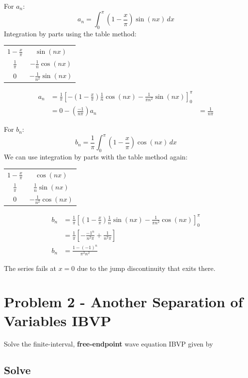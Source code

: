 \documentclass[11pt]{article}
\begin{document}
    For $a_n$:
    \[
        a_n = \int_0^{\pi} (1-\frac{x}{\pi}) \sin(nx) \,dx
    \]
    Integration by parts using the table method:
    \begin{tabular}{ |c| c| }
        \hline
        $1-\frac{x}{\pi}$ & $\sin(nx)$ \\
        $\frac{1}{\pi}$ & $-\frac{1}{n} \cos(nx)$ \\
        $0$ & $-\frac{1}{n^2} \sin(nx)$ \\
        \hline
    \end{tabular}
    \begin{align*}
        a_n &= \frac{1}{\pi} \left[-(1-\frac{x}{\pi})\frac{1}{n} \cos(nx) - \frac{1}{\pi n^2}\sin(nx)  \right]_0^{\pi}\\
        &= 0 - (\frac{-1}{n \pi})
        a_n &= \frac{1}{n \pi}
    \end{align*}

    For $b_n$:
    \[
        b_n = \frac{1}{\pi} \int_{0}^{\pi} (1-\frac{x}{\pi}) \cos(nx) \,dx
    \]
    We can use integration by parts with the table method again:

    \begin{tabular}{ |c| c| }
        \hline
        $1-\frac{x}{\pi}$ & $\cos(nx)$ \\
        $\frac{1}{\pi}$ & $\frac{1}{n} \sin(nx)$ \\
        $0$ & $-\frac{1}{n^2} \cos(nx)$ \\
        \hline
    \end{tabular}

    \begin{align*}
        b_n &= \frac{1}{\pi} \left[ (1-\frac{x}{\pi})\frac{1}{n} \sin(nx) - \frac{1}{\pi n^2}\cos(nx) \right]_0^{\pi}\\
        &= \frac{1}{\pi} \left[ - \frac{-1^n}{n^2\pi} + \frac{1}{n^2 \pi} \right]\\
        b_n &= \frac{1-(-1)^n}{\pi^2 n^2}
    \end{align*}

    The series fails at $x=0$ due to the jump discontinuity that exits there.

    \newpage
    \section*{Problem 2 - Another Separation of Variables IBVP}
    Solve the finite-interval, \textbf{free-endpoint} wave equation IBVP given by
    \setcounter{subsection}{0}
    \subsection{Solve}
\end{document}
